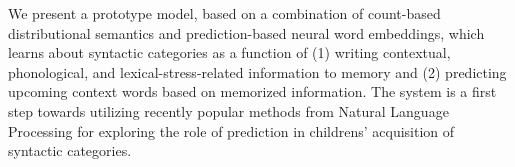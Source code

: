 We present a prototype model, based on a combination of count-based distributional semantics and prediction-based neural word embeddings, which learns about syntactic categories as a function of (1) writing contextual, phonological, and lexical-stress-related information to memory and (2) predicting upcoming context words based on memorized information. The system is a first step towards utilizing recently popular methods from Natural Language Processing for exploring the role of prediction in childrens' acquisition of syntactic categories.
